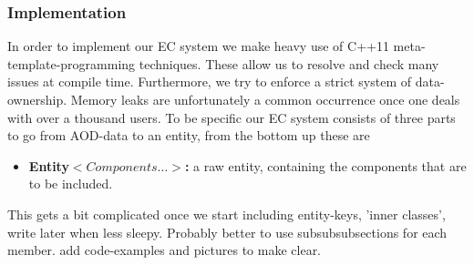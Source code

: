 \documentclass[a4paper]{report}
\begin{document}
\subsubsection{Implementation}
In order to implement our EC system we make heavy use of C++11 meta-template-programming techniques. These allow us to resolve and check many issues at compile time. Furthermore,
we try to enforce a strict system of data-ownership. Memory leaks are unfortunately a common occurrence once one deals with over a thousand users.
To be specific our EC system consists of three parts to go from AOD-data to an entity, from the bottom up these are
\begin{itemize}
  \item{\bf Entity$<Components\ldots>$:} a raw entity, containing the components that are to be included.
\end{itemize}
This gets a bit complicated once we start including entity-keys, 'inner classes', write later when less sleepy. Probably better to use subsubsubsections for each member.
add code-examples and pictures to make clear.
%
\end{document}
